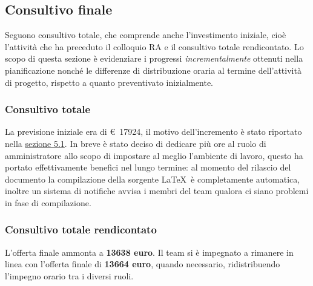\subsection{Consultivo finale}
    Seguono consultivo totale, che comprende anche l'investimento iniziale, cioè l'attività che ha preceduto il colloquio RA e il consultivo totale rendicontato. Lo scopo di questa sezione è evidenziare i progressi \textit{incrementalmente} ottenuti nella pianificazione nonché le differenze di distribuzione oraria al termine dell'attività di progetto, rispetto a quanto preventivato inizialmente.
    \subsubsection{Consultivo totale}
        \def\salarycontent{
            {Amministratore,118,20,2360},
            {Analista,      91,25,2275},
            {Progettista,   189,22,4158},
            {Programmatore, 253,15,3795},
            {Responsabile,  67,30,2010},
            {Verificatore,  250,15,3750},
            {Totale,        968,127,18348},
        }
        
        La previsione iniziale era di \euro\ 17924, il motivo dell'incremento è stato riportato nella \hyperref[section:consultivo_analisi]{sezione 5.1}. In breve è stato deciso di dedicare più ore al ruolo di amministratore allo scopo di impostare al meglio l'ambiente di lavoro, questo ha portato effettivamente benefici nel lungo termine: al momento del rilascio del documento la compilazione della sorgente \LaTeX\ è completamente automatica, inoltre un sistema di notifiche avvisa i membri del team qualora ci siano problemi in fase di compilazione.
    \subsubsection{Consultivo totale rendicontato}
        \def\salarycontent{
            {Amministratore,54,20,1080},
            {Analista,      47,25,1175},
            {Progettista,   169,22,3718},
            {Programmatore, 253,15,3795},
            {Responsabile,  41,30,1230},
            {Verificatore,  176,15,2640},
            {Totale,        740,127,13638},
        }
        
        L'offerta finale ammonta a \textbf{13638 euro}. Il team si è impegnato a rimanere in linea con l'offerta finale di \textbf{13664 euro}, quando necessario, ridistribuendo l'impegno orario tra i diversi ruoli. 
